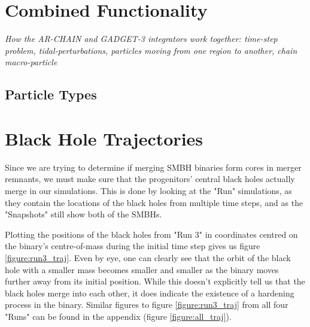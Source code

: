 \documentclass[english, oneside]{HYgradu}
\begin{document}
\section{Combined Functionality}

\textit{How the AR-CHAIN and GADGET-3 integrators work together: time-step problem, tidal-perturbations, particles moving from one region to another, chain macro-particle}

\subsection{Particle Types}


\section{Black Hole Trajectories}

Since we are trying to determine if merging SMBH binaries form cores in merger remnants, we must make sure that the progenitors' central black holes actually merge in our simulations. This is done by looking at the "Run" simulations, as they contain the locations of the black holes from multiple time steps, and as the "Snapshots" still show both of the SMBHs.

Plotting the positions of the black holes from "Run 3" in coordinates centred on the binary's centre-of-mass during the initial time step gives us figure \ref{figure:run3_traj}. Even by eye, one can clearly see that the orbit of the black hole with a smaller mass becomes smaller and smaller as the binary moves further away from its initial position. While this doesn't explicitly tell us that the black holes merge into each other, it does indicate the existence of a hardening process in the binary. Similar figures to figure \ref{figure:run3_traj} from all four "Runs" can be found in the appendix (figure \ref{figure:all_traj}).
\end{document}
